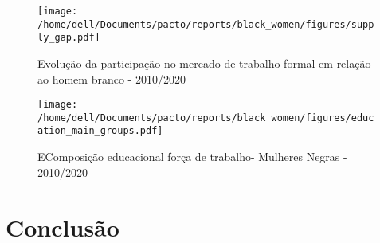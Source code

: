 \documentclass[12pt]{article}
\begin{document}
\begin{figure}[H]
    \centering
    \caption{Evolução da participação no mercado de trabalho formal em relação ao homem branco - 2010/2020}
        \texttt{[image: /home/dell/Documents/pacto/reports/black\_women/figures/supply\_gap.pdf]}
    \label{fig:supply_gap}
\end{figure}




\begin{figure}[H]
    \centering
    \caption{EComposição educacional força de trabalho- Mulheres Negras - 2010/2020}
        \texttt{[image: /home/dell/Documents/pacto/reports/black\_women/figures/education\_main\_groups.pdf]}
\end{figure}

\section{Conclusão}

\clearpage

\printbibliography[title={Bibliografia}, nottype=misc]
\end{document}

